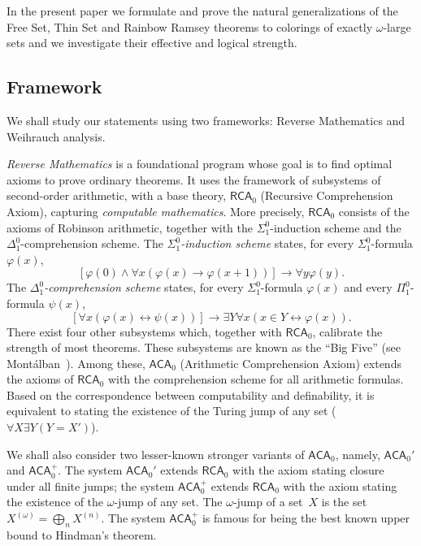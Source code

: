 \documentclass{article}
\newcommand{\RCA}[0]{\mathsf{RCA}}
\newcommand{\ACA}[0]{\mathsf{ACA}}
\def\qt#1{``#1''}%
\numberwithin{theorem}{section}
\newcommand{\lorenzo}[1]{\textcolor{orange}{#1}}
\begin{document}
In the present paper we formulate and prove the natural generalizations of the Free Set, Thin Set and Rainbow Ramsey theorems to colorings of exactly $\omega$-large sets and we investigate their effective and logical strength. 

\subsection{Framework}
We shall study our statements using two frameworks: Reverse Mathematics and Weihrauch analysis.

\emph{Reverse Mathematics} is a foundational program whose goal is to find optimal axioms to prove ordinary theorems. It uses the framework of subsystems of second-order arithmetic, with a base theory, $\RCA_0$ (Recursive Comprehension Axiom), capturing \emph{computable mathematics}. More precisely, $\RCA_0$ consists of the axioms of Robinson arithmetic, together with the $\Sigma^0_1$-induction scheme and the $\Delta^0_1$-comprehension scheme.
The \emph{$\Sigma^0_1$-induction scheme} states, for every $\Sigma^0_1$-formula $\varphi(x)$,
$$
[\varphi(0) \wedge \forall x (\varphi(x) \rightarrow \varphi(x+1))] \rightarrow \forall y \varphi(y).
$$
The \emph{$\Delta^0_1$-comprehension scheme} states, for every $\Sigma^0_1$-formula $\varphi(x)$ and every $\Pi^0_1$-formula $\psi(x)$,
$$
[\forall x(\varphi(x) \leftrightarrow \psi(x))] \rightarrow \exists Y \forall x (x \in Y \leftrightarrow \varphi(x)).
$$
There exist four other subsystems which, together with $\RCA_0$, calibrate the strength of most theorems. These subsystems are known as the \qt{Big Five} (see Mont\'alban~\cite{montalban_open_2011}). Among these, $\ACA_0$ (Arithmetic Comprehension Axiom) extends the axioms of $\RCA_0$ with the comprehension scheme for all arithmetic formulas. Based on the correspondence between computability and definability, it is equivalent to stating the existence of the Turing jump of any set ($\forall X \exists Y (Y = X')$).

We shall also consider two lesser-known stronger variants of $\ACA_0$, namely, $\ACA_0'$ and $\ACA_0^+$. The system $\ACA_0'$ extends $\RCA_0$ with the axiom stating closure under all finite jumps; the system $\ACA_0^+$ extends $\RCA_0$ with the axiom stating the existence of the $\omega$-jump of any set. The $\omega$-jump of a set~$X$ is the set $X^{(\omega)} = \bigoplus_n X^{(n)}$. The system $\ACA_0^+$ is famous for being the best known upper bound to Hindman's theorem.%
\end{document}
